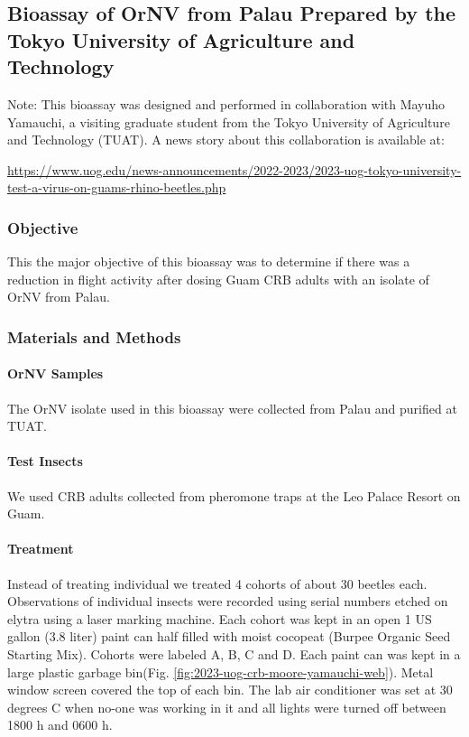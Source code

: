 \documentclass[12pt,letterpaper,english,bibliography=totocnumbered, abstract=on]{scrartcl}
\begin{document}
\clearpage

\subsection{Bioassay of OrNV from Palau Prepared by the Tokyo University of Agriculture and Technology}

Note: This bioassay was designed and performed in collaboration with Mayuho Yamauchi, a visiting graduate student from the Tokyo University of Agriculture and Technology (TUAT).
A news story about this collaboration is available at:\\
\begin{tiny}
\url{https://www.uog.edu/news-announcements/2022-2023/2023-uog-tokyo-university-test-a-virus-on-guams-rhino-beetles.php}
\end{tiny}

\subsubsection{Objective}

This the major objective of this bioassay was to determine if there was a reduction in flight activity after dosing Guam CRB adults with an isolate of OrNV from Palau.

\subsubsection{Materials and Methods}

\paragraph{OrNV Samples}

The OrNV isolate used in this bioassay were collected from Palau and purified at TUAT.

\paragraph{Test Insects}

We used CRB adults collected from pheromone traps at the Leo Palace Resort on Guam.

\paragraph{Treatment}

Instead of treating individual we treated 4 cohorts of about 30 beetles each. Observations of individual insects were recorded using serial numbers etched on elytra using a laser marking machine. Each cohort was kept in an open 1 US gallon (3.8 liter) paint can half filled with moist cocopeat (Burpee Organic Seed Starting Mix). Cohorts were labeled A, B, C and D. Each paint can was kept in a large plastic garbage bin(Fig. \ref{fig:2023-uog-crb-moore-yamauchi-web}). Metal window screen covered the top of each bin. The lab air conditioner was set at 30 degrees C when no-one was working in it and all lights were turned off between 1800 h and 0600 h.
\end{document}
